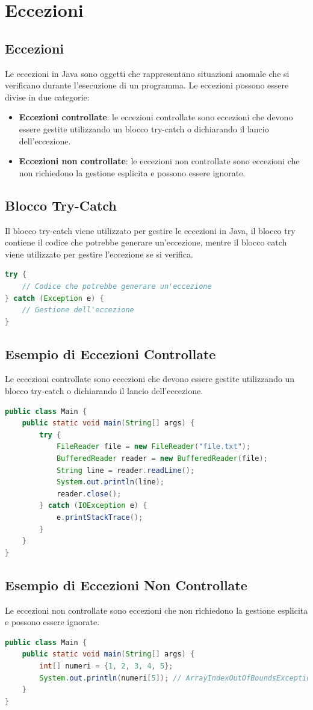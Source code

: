 \documentclass[11pt]{article}
\begin{document}
\section{Eccezioni}
\subsection{Eccezioni}
Le eccezioni in Java sono oggetti che rappresentano situazioni anomale che si verificano durante l'esecuzione di un programma.
Le eccezioni possono essere divise in due categorie:
\begin{itemize}
    \item \textbf{Eccezioni controllate}: le eccezioni controllate sono eccezioni che devono essere gestite utilizzando un blocco try-catch o dichiarando il lancio dell'eccezione.
    \item \textbf{Eccezioni non controllate}: le eccezioni non controllate sono eccezioni che non richiedono la gestione esplicita e possono essere ignorate.
    \end{itemize}
\subsection{Blocco Try-Catch}
Il blocco try-catch viene utilizzato per gestire le eccezioni in Java, il blocco try contiene il codice che potrebbe generare un'eccezione,
mentre il blocco catch viene utilizzato per gestire l'eccezione se si verifica.
\begin{lstlisting}[language=Java]
try {
    // Codice che potrebbe generare un'eccezione
} catch (Exception e) {
    // Gestione dell'eccezione
}
\end{lstlisting}
\subsection{Esempio di Eccezioni Controllate}
Le eccezioni controllate sono eccezioni che devono essere gestite utilizzando un blocco try-catch o dichiarando il lancio dell'eccezione.
\begin{lstlisting}[language=Java]
public class Main {
    public static void main(String[] args) {
        try {
            FileReader file = new FileReader("file.txt");
            BufferedReader reader = new BufferedReader(file);
            String line = reader.readLine();
            System.out.println(line);
            reader.close();
        } catch (IOException e) {
            e.printStackTrace();
        }
    }
}
\end{lstlisting}
\subsection{Esempio di Eccezioni Non Controllate}
Le eccezioni non controllate sono eccezioni che non richiedono la gestione esplicita e possono essere ignorate.
\begin{lstlisting}[language=Java]
public class Main {
    public static void main(String[] args) {
        int[] numeri = {1, 2, 3, 4, 5};
        System.out.println(numeri[5]); // ArrayIndexOutOfBoundsException
    }
}
\end{lstlisting}
\end{document}
